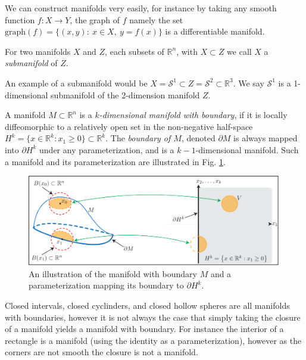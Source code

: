 We can construct manifolds very easily, for instance by taking any smooth function $f:X \to Y$, the graph of $f$ namely the set $ \textrm{graph} (f)=\{(x,y):\ x\in X,\ y=f(x)\}$ is a differentiable manifold. 

\begin{definition}
	For two manifolds $X$ and $Z$, each subsets of $\mathbb{R}^{n}$, with $X \subset Z$ we call $X$ a \emph{submanifold} of $Z$. 
\end{definition}
An example of a submanifold would be $X=\mathcal{S}^{1}\subset Z = \mathcal{S}^{2} \subset \mathbb{R}^{3}$. We say $\mathcal{S}^{1}$ is a 1-dimensional submanifold of the 2-dimension manifold $Z$.

\begin{definition}
	A manifold $M\subset \mathbb{R}^{n}$ is a \emph{$k$-dimensional manifold with boundary}, if it is locally diffeomorphic to a relatively open set in the non-negative half-space $H^{k}=\{x\in \mathbb{R}^k: x_1 \geq 0\} \subset \mathbb{R}^{k}$. The \emph{boundary of $M$}, denoted $\partial M$ is always mapped into $\partial H^{k}$ under any parameterization, and is a $k-1$-dimensional manifold. Such a manifold and its parameterization are illustrated in Fig. \ref{fig:bndry_mfd_def}.
	\begin{figure}[h!]
		\centering
		\includegraphics[width=0.99\textwidth]{figures/ch9/5bndry_mfd_def.pdf}
		\caption{An illustration of the manifold with boundary $M$ and a parameterization mapping its boundary to $\partial H^{k}$.}
		\label{fig:bndry_mfd_def}
	\end{figure}
\end{definition}

Closed intervals, closed cyclinders, and closed hollow spheres are all manifolds with boundaries, however it is not always the case that simply taking the closure of a manifold yields a manifold with boundary. For instance the interior of a rectangle is a manifold (using the identity as a parameterization), however as the corners are not smooth the closure is not a manifold.

